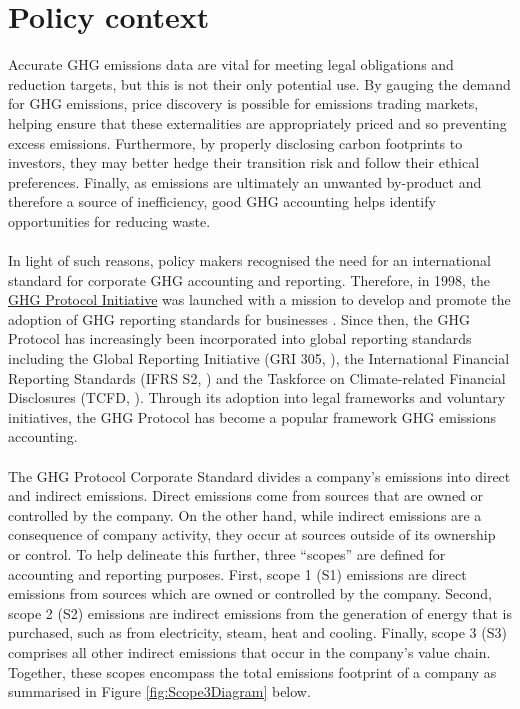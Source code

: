 \documentclass[12pt,twoside]{report}
\begin{document}
\section{Policy context}\label{sec:PolicyContext}
Accurate GHG emissions data are vital for meeting legal obligations and reduction targets, but this is not their only potential use. By gauging the demand for GHG emissions, price discovery is possible for emissions trading markets, helping ensure that these externalities are appropriately priced and so preventing excess emissions. Furthermore, by properly disclosing carbon footprints to investors, they may better hedge their transition risk and follow their ethical preferences. Finally, as emissions are ultimately an unwanted by-product and therefore a source of inefficiency, good GHG accounting helps identify opportunities for reducing waste. 
\\\\
In light of such reasons, policy makers recognised the need for an international standard for corporate GHG accounting and reporting. Therefore, in 1998, the \href{https://ghgprotocol.org/about-us}{GHG Protocol Initiative} was launched with a mission to develop and promote the adoption of GHG reporting standards for businesses \cite{ghgprotocol2004}. Since then, the GHG Protocol has increasingly been incorporated into global reporting standards including the Global Reporting Initiative (GRI 305, \cite{gri2016}), the International Financial Reporting Standards (IFRS S2, \cite{ifrs2023}) and the Taskforce on Climate-related Financial Disclosures (TCFD, \cite{tcfd2021}). Through its adoption into legal frameworks and voluntary initiatives, the GHG Protocol has become a popular framework GHG emissions accounting.
\\\\
The GHG Protocol Corporate Standard divides a company's emissions into direct and indirect emissions. Direct emissions come from sources that are owned or controlled by the company. On the other hand, while indirect emissions are a consequence of company activity, they occur at sources outside of its ownership or control. To help delineate this further, three ``scopes'' are defined for accounting and reporting purposes. First,  scope 1 (S1) emissions are direct emissions from sources which are owned or controlled by the company. Second, scope 2 (S2) emissions are indirect emissions from the generation of energy that is purchased, such as from electricity, steam, heat and cooling. Finally, scope 3 (S3) comprises all other indirect emissions that occur in the company's value chain. Together, these scopes encompass the total emissions footprint of a company as summarised in Figure \ref{fig:Scope3Diagram} below.
\end{document}
